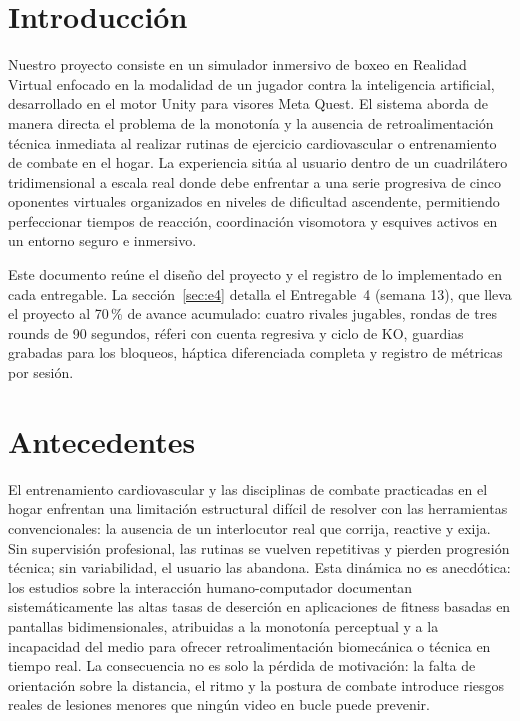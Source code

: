 \section{Introducción}
Nuestro proyecto consiste en un simulador inmersivo de boxeo en Realidad Virtual enfocado en la modalidad de un jugador contra la inteligencia artificial, desarrollado en el motor Unity para visores Meta Quest. El sistema aborda de manera directa el problema de la monotonía y la ausencia de retroalimentación técnica inmediata al realizar rutinas de ejercicio cardiovascular o entrenamiento de combate en el hogar. La experiencia sitúa al usuario dentro de un cuadrilátero tridimensional a escala real donde debe enfrentar a una serie progresiva de cinco oponentes virtuales organizados en niveles de dificultad ascendente, permitiendo perfeccionar tiempos de reacción, coordinación visomotora y esquives activos en un entorno seguro e inmersivo.

Este documento reúne el diseño del proyecto y el registro de lo implementado en cada entregable. La sección~\ref{sec:e4} detalla el Entregable~4 (semana 13), que lleva el proyecto al 70\,\% de avance acumulado: cuatro rivales jugables, rondas de tres rounds de 90 segundos, réferi con cuenta regresiva y ciclo de KO, guardias grabadas para los bloqueos, háptica diferenciada completa y registro de métricas por sesión.

\section{Antecedentes}
El entrenamiento cardiovascular y las disciplinas de combate practicadas en el hogar enfrentan una limitación estructural difícil de resolver con las herramientas convencionales: la ausencia de un interlocutor real que corrija, reactive y exija. Sin supervisión profesional, las rutinas se vuelven repetitivas y pierden progresión técnica; sin variabilidad, el usuario las abandona. Esta dinámica no es anecdótica: los estudios sobre la interacción humano-computador documentan sistemáticamente las altas tasas de deserción en aplicaciones de fitness basadas en pantallas bidimensionales, atribuidas a la monotonía perceptual y a la incapacidad del medio para ofrecer retroalimentación biomecánica o técnica en tiempo real. La consecuencia no es solo la pérdida de motivación: la falta de orientación sobre la distancia, el ritmo y la postura de combate introduce riesgos reales de lesiones menores que ningún video en bucle puede prevenir.


